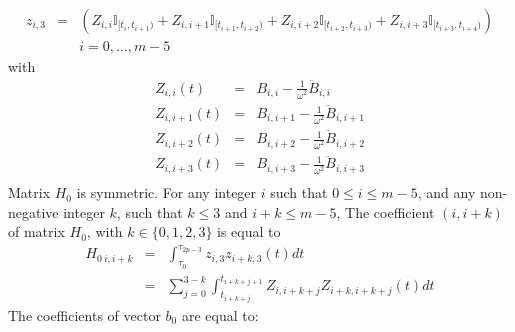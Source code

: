 \documentclass {article}
\newcommand\z{z}
\begin{document}
\begin{eqnarray*}
z_{i,3} &=& (Z_{i, i} \mathbb{I}_{[t_i, t_{i+1})} + Z_{i,i+1} \mathbb{I}_{[t_{i+1}, t_{i+2})} +Z_{i,i+2} \mathbb{I}_{[t_{i+2}, t_{i+3})}+Z_{i,i+3} \mathbb{I}_{[t_{i+3}, t_{i+4})})\\
&&i=0,\ldots, m-5
\end{eqnarray*}
with
\begin{eqnarray*}
Z_{i, i} (t) &=& B_{i,i} - \frac{1}{\omega^2} \ddot{B}_{i,i} \\
Z_{i,i+1} (t) &=& B_{i,i+1} - \frac{1}{\omega^2} \ddot{B}_{i,i+1} \\
Z_{i,i+2} (t) &=& B_{i,i+2} - \frac{1}{\omega^2} \ddot{B}_{i,i+2} \\
Z_{i,i+3} (t) &=& B_{i,i+3} - \frac{1}{\omega^2} \ddot{B}_{i,i+3} \\
\end{eqnarray*}
Matrix $H_0$ is symmetric. For any integer $i$ such that $0\leq i \leq m-5$, and any non-negative integer $k$, such that $k \leq 3$ and $i+k \leq m-5$,
The coefficient $(i,i+k)$ of matrix $H_0$, with $k\in\{0,1,2,3\}$ is equal to
\begin{eqnarray*}
H_{0\ i,i+k} &=& \int_{\tau_0}^{\tau_{2p-3}} \z_{i,3} \z_{i+k,3}(t)dt\\
&=& \sum_{j=0}^{3-k} \int_{t_{i+k+j}}^{t_{i+k+j+1}}Z_{i,i+k+j} Z_{i+k,i+k+j} (t) dt
\end{eqnarray*}
The coefficients of vector $b_0$ are equal to:
\end{document}
